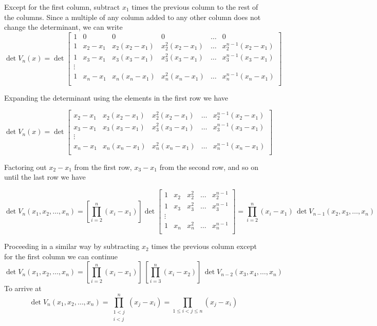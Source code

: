 Except for the first column, subtract $x_1$ times the previous column to the rest of the columns. Since a multiple of any column added to any other column does not change the determinant, we can write
$$\det{V_n(x)} =  
\det{\begin{bmatrix}
1 & 0 & 0 & 0 & \hdots & 0 \\
1 & x_2 - x_1 & x_2(x_2 - x_1) & x_2^2(x_2 - x_1) & \hdots & x_2^{n-1}(x_2-x_1) \\
1 &  x_3 -x_1 & x_3(x_3 - x_1) & x_3^2(x_3 - x_1) & \hdots & x_3^{n-1}(x_3-x_1) \\
\vdots \\
1 & x_n-x_1 & x_n(x_n - x_1) & x_n^2(x_n - x_1) & \hdots & x_n^{n-1}(x_n-x_1) \\
\end{bmatrix}}
$$

Expanding the determinant using the elements in the first row we have

$$\det{V_n(x)} =  
\det{\begin{bmatrix}
x_2 - x_1 & x_2(x_2 - x_1) & x_2^2(x_2 - x_1) & \hdots & x_2^{n-1}(x_2-x_1) \\
x_3 -x_1 & x_3(x_3 - x_1) & x_3^2(x_3 - x_1) & \hdots & x_3^{n-1}(x_3-x_1) \\
\vdots \\
x_n-x_1 & x_n(x_n - x_1) & x_n^2(x_n - x_1) & \hdots & x_n^{n-1}(x_n-x_1) \\
\end{bmatrix}}
$$

Factoring out $x_2-x_1$ from the first row, $x_3-x_1$ from the second row, and so on until the last row we have

$$\det{V_n(x_1,x_2,\hdots,x_n)} =  
[\prod_{i = 2}^n (x_i - x_1)] 
\det{\begin{bmatrix}
1 & x_2  & x_2^2 & \hdots & x_2^{n-1} \\
1 & x_3  & x_3^2 & \hdots & x_3^{n-1} \\
\vdots \\
1 & x_n & x_n^2 & \hdots & x_n^{n-1} \\
\end{bmatrix} }=
\prod_{i = 2}^n (x_i - x_1) \, \det{V_{n-1}(x_2,x_3,\hdots,x_n)}
$$
 
 Proceeding in a similar way by subtracting $x_2$ times the previous column except for the first column we can continue
$$\det{V_n(x_1,x_2,\hdots,x_n)} =  
[\prod_{i = 2}^n (x_i - x_1)] \,
[\prod_{i = 3}^n (x_i - x_2)] \, \det{V_{n-2}(x_3,x_4,\hdots,x_n)}
$$
To arrive at 
$$\det{V_n(x_1,x_2,\hdots,x_n)} =  \prod_{\substack{1 < j \\ i < j}}^n (x_j - x_i) =  \prod_{1 \le i < j \le  n } (x_j - x_i)
$$

